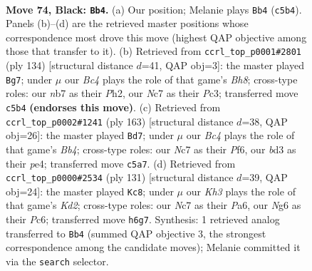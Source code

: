 \documentclass[11pt]{article}
\begin{document}
\clearpage

\begin{figure}[p]\centering
\begin{subfigure}{0.46\textwidth}\centering
\resizebox{\linewidth}{!}{%
\newchessgame
\chessboard[
  setfen={8/1Nn5/6nk/p1b5/P2pP3/1P1B3p/1K2P3/8 b - - 15 74},
  showmover=false,
  pgfstyle=straightmove, color=movearrow, markmove={c5-b4}
]}
\caption{}
\end{subfigure}\hfill
\begin{subfigure}{0.46\textwidth}\centering
\resizebox{\linewidth}{!}{%
\newchessgame
\chessboard[
  setfen={7B/1p6/4k1p1/P1K1P2p/2p5/2Pb2P1/7P/8 w - - 23 68},
  showmover=false,
  pgfstyle=straightmove, color=movearrow, markmove={h8-g7}
]}
\caption{}
\end{subfigure}
\\[4pt]
\begin{subfigure}{0.46\textwidth}\centering
\resizebox{\linewidth}{!}{%
\newchessgame
\chessboard[
  setfen={7n/7k/3N1p1p/1b1Pp3/p3P1P1/B4P2/5K2/8 b - - 19 82},
  showmover=false,
  pgfstyle=straightmove, color=movearrow, markmove={b5-d7}
]}
\caption{}
\end{subfigure}\hfill
\begin{subfigure}{0.46\textwidth}\centering
\resizebox{\linewidth}{!}{%
\newchessgame
\chessboard[
  setfen={8/3k4/p1p1n1p1/7p/P3PB1P/1K4P1/1P6/8 b - - 30 66},
  showmover=false,
  pgfstyle=straightmove, color=movearrow, markmove={d7-c8}
]}
\caption{}
\end{subfigure}
\caption{\textbf{Move 74, Black: \texttt{Bb4}.} (a) Our position; Melanie plays \texttt{Bb4} (\texttt{c5b4}). Panels (b)--(d) are the retrieved master positions whose correspondence most drove this move (highest QAP objective among those that transfer to it). (b) Retrieved from \texttt{ccrl\_top\_p0001\#2801} (ply 134) [structural distance $d$=41, QAP obj=3]: the master played \texttt{Bg7}; under $\mu$ our \emph{Bc4} plays the role of that game's \emph{Bh8}; cross-type roles: our \emph{n}b7 as their \emph{P}h2, our \emph{N}c7 as their \emph{P}c3; transferred move \texttt{c5b4} \textbf{(endorses this move)}. (c) Retrieved from \texttt{ccrl\_top\_p0002\#1241} (ply 163) [structural distance $d$=38, QAP obj=26]: the master played \texttt{Bd7}; under $\mu$ our \emph{Bc4} plays the role of that game's \emph{Bb4}; cross-type roles: our \emph{N}c7 as their \emph{P}f6, our \emph{b}d3 as their \emph{p}e4; transferred move \texttt{c5a7}. (d) Retrieved from \texttt{ccrl\_top\_p0000\#2534} (ply 131) [structural distance $d$=39, QAP obj=24]: the master played \texttt{Kc8}; under $\mu$ our \emph{Kh3} plays the role of that game's \emph{Kd2}; cross-type roles: our \emph{N}c7 as their \emph{P}a6, our \emph{N}g6 as their \emph{P}c6; transferred move \texttt{h6g7}. Synthesis: 1 retrieved analog transferred to \texttt{Bb4} (summed QAP objective 3, the strongest correspondence among the candidate moves); Melanie committed it via the \texttt{search} selector.}
\label{fig:thought-m147}
\end{figure}
\end{document}
